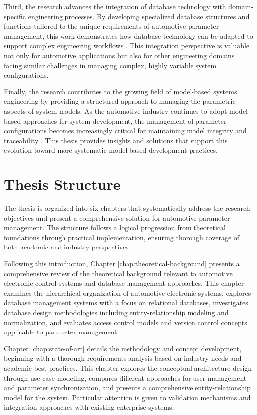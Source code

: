 Third, the research advances the integration of database technology with domain-specific engineering processes. By developing specialized database structures and functions tailored to the unique requirements of automotive parameter management, this work demonstrates how database technology can be adapted to support complex engineering workflows \cite{elmasri2015fundamentals}. This integration perspective is valuable not only for automotive applications but also for other engineering domains facing similar challenges in managing complex, highly variable system configurations.

Finally, the research contributes to the growing field of model-based systems engineering by providing a structured approach to managing the parametric aspects of system models. As the automotive industry continues to adopt model-based approaches for system development, the management of parameter configurations becomes increasingly critical for maintaining model integrity and traceability \cite{staron2021automotive}. This thesis provides insights and solutions that support this evolution toward more systematic model-based development practices.

\section{Thesis Structure}
\label{sec:structure}

The thesis is organized into six chapters that systematically address the research objectives and present a comprehensive solution for automotive parameter management. The structure follows a logical progression from theoretical foundations through practical implementation, ensuring thorough coverage of both academic and industry perspectives.

Following this introduction, Chapter \ref{chap:theoretical-background} presents a comprehensive review of the theoretical background relevant to automotive electronic control systems and database management approaches. This chapter examines the hierarchical organization of automotive electronic systems, explores database management systems with a focus on relational databases, investigates database design methodologies including entity-relationship modeling and normalization, and evaluates access control models and version control concepts applicable to parameter management.

Chapter \ref{chap:state-of-art} details the methodology and concept development, beginning with a thorough requirements analysis based on industry needs and academic best practices. This chapter explores the conceptual architecture design through use case modeling, compares different approaches for user management and parameter synchronization, and presents a comprehensive entity-relationship model for the system. Particular attention is given to validation mechanisms and integration approaches with existing enterprise systems.

